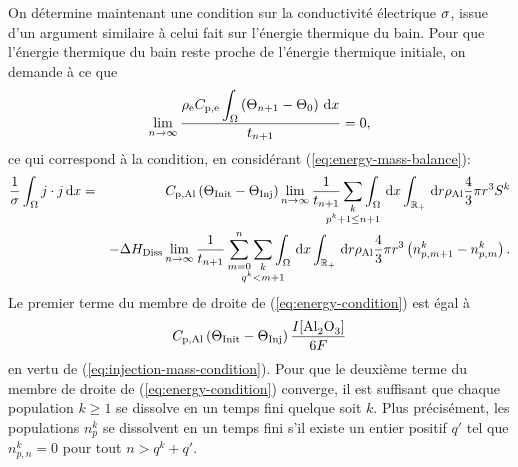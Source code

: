 On détermine maintenant une condition sur la conductivité électrique
$\sigma$, issue d'un argument similaire à celui fait sur
l'énergie thermique du bain. Pour que l'énergie thermique du bain
reste proche de l'énergie thermique initiale, on demande à ce que
\begin{equation}
  \lim_{n\to\infty}\frac{\rho_\mathrm{e}C_{\mathrm{p,e}}\displaystyle\int_\Omega\left( \Theta_{n+1}
    - \Theta_0 \right)\,\mathrm dx}{t_{n+1}} = 0,
\end{equation}
ce qui correspond à la condition, en considérant (\ref{eq:energy-mass-balance}):
\begin{eqnarray}
  \frac{1}{\conductivity} \int_\Omega j\cdot j\intd{x} &=&
  \aluminahc\parent{\tinit - \tinj}\lim_{n\to\infty}\frac{1}{t_{n+1}}\sum_{\mathclap{\substack{k\\ p^k +
  1 \leq n + 1}}}\int_\Omega\intd{x}\int_\rplus\intd{r}\aluminadensity
  \frac{4}{3}\pi r^3 S^k\nonumber \\
  &&-
       {\aluminadissolutionenthalpy}\lim_{n\to\infty}\frac{1}{t_{n+1}}\sum_{m = 0}^{n}\sum_{\mathclap{\substack{k\\ q^k < m + 1}}} \int_\Omega\intd{x}\int_\rplus\intd{r} \aluminadensity \frac{4}{3}\pi r^3\parent{n_{p,m+1}^k-n_{p,m}^k}.\nonumber\\
       \label{eq:energy-condition}
\end{eqnarray}
Le premier terme du membre de droite de (\ref{eq:energy-condition})
est égal à
\begin{equation*}
  \aluminahc\parent{\tinit-\tinj}  \frac{I[\cee{Al2O3}]}{6F}
\end{equation*}
en vertu de (\ref{eq:injection-mass-condition}). Pour que le deuxième
terme du membre de droite de (\ref{eq:energy-condition}) converge, il
est suffisant que chaque population $k\geq 1$ se dissolve en un temps
fini quelque soit $k$. Plus précisément, les populations $n_p^k$
se dissolvent en un temps fini s'il existe un entier positif $q'$ tel
que $n_{p,n}^k = 0$ pour tout $n > q^k + q'$.

